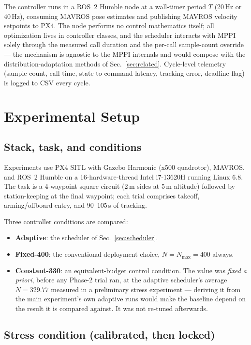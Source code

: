 \documentclass[conference]{IEEEtran}
\begin{document}
The controller runs in a ROS~2 Humble node at a wall-timer period $T$
(20\,Hz or 40\,Hz), consuming MAVROS pose estimates and publishing MAVROS
velocity setpoints to PX4. The node performs no control mathematics
itself; all optimization lives in controller classes, and the scheduler
interacts with MPPI solely through the measured call duration and the
per-call sample-count override --- the mechanism is agnostic to the MPPI
internals and would compose with the distribution-adaptation methods of
Sec.~\ref{sec:related}. Cycle-level telemetry (sample count, call time,
state-to-command latency, tracking error, deadline flag) is logged to CSV
every cycle.

\section{Experimental Setup}
\label{sec:setup}

\subsection{Stack, task, and conditions}

Experiments use PX4 SITL with Gazebo Harmonic (x500 quadrotor), MAVROS,
and ROS~2 Humble on a 16-hardware-thread Intel i7-13620H running Linux
6.8. The task is a 4-waypoint square circuit (2\,m sides at 5\,m
altitude) followed by station-keeping at the final waypoint; each trial
comprises takeoff, arming/offboard entry, and 90--105\,s of tracking.

Three controller conditions are compared:
\begin{itemize}
  \item \textbf{Adaptive}: the scheduler of Sec.~\ref{sec:scheduler}.
  \item \textbf{Fixed-400}: the conventional deployment choice,
  $N = N_{\max} = 400$ always.
  \item \textbf{Constant-330}: an equivalent-budget control condition.
  The value was \emph{fixed a priori}, before any Phase-2 trial ran, at
  the adaptive scheduler's average $N = 329.77$ measured in a
  preliminary stress experiment --- deriving it from the main
  experiment's own adaptive runs would make the baseline depend on the
  result it is compared against. It was not re-tuned afterwards.
\end{itemize}

\subsection{Stress condition (calibrated, then locked)}
\label{sec:stress}
\end{document}
